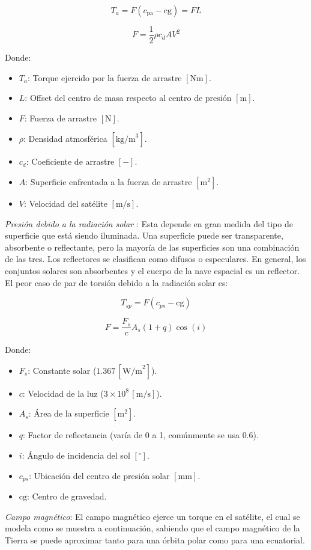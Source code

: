 \[
T_a = F(c_{\text{pa}} - \text{cg}) = F L
\]

\[
F = \frac{1}{2} \rho c_d A V^2
\]

Donde:
\begin{itemize}
	\item $T_a$: Torque ejercido por la fuerza de arrastre $[\text{Nm}]$.
	\item $L$: Offset del centro de masa respecto al centro de presión $[\text{m}]$.
	\item $F$: Fuerza de arrastre $[\text{N}]$.
	\item $\rho$: Densidad atmosférica $[\text{kg/m}^3]$.
	\item $c_d$: Coeficiente de arrastre $[-]$.
	\item $A$: Superficie enfrentada a la fuerza de arrastre $[\text{m}^2]$.
	\item $V$: Velocidad del satélite $[\text{m/s}]$.
\end{itemize}


\textit{Presión debido a la radiación solar \cite{8}}: Esta depende en gran medida del tipo de superficie que está siendo iluminada. Una superficie puede ser transparente, absorbente o reflectante, pero la mayoría de las superficies son una combinación de las tres. Los reflectores se clasifican como difusos o especulares. En general, los conjuntos solares son absorbentes y el cuerpo de la nave espacial es un reflector. El peor caso de par de torsión debido a la radiación solar es:

\[
T_{sp} = F(c_{ps} - \text{cg})
\]

\[
F = \frac{F_s}{c} A_s (1 + q) \cos(i)
\]

Donde:
\begin{itemize}
	\item $F_s$: Constante solar ($1.367 \, [\text{W/m}^2]$).
	\item $c$: Velocidad de la luz ($3 \times 10^8 \, [\text{m/s}]$).
	\item $A_s$: Área de la superficie $[\text{m}^2]$.
	\item $q$: Factor de reflectancia (varía de 0 a 1, comúnmente se usa $0.6$).
	\item $i$: Ángulo de incidencia del sol $[^\circ]$.
	\item $c_{ps}$: Ubicación del centro de presión solar $[\text{mm}]$.
	\item $\text{cg}$: Centro de gravedad.
\end{itemize}

\textit{Campo magnético}: El campo magnético ejerce un torque en el satélite, el cual se modela como se muestra a continuación, sabiendo que el campo magnético de la Tierra se puede aproximar tanto para una órbita polar como para una ecuatorial.

